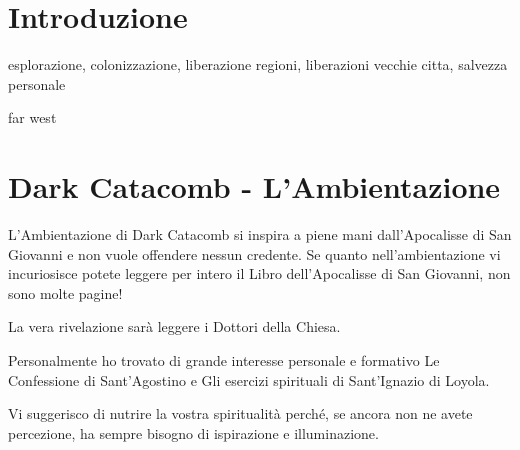 \documentclass[12pt,a4paper,twoside,openany]{book}
\begin{document}








\section{Introduzione}


esplorazione, colonizzazione, liberazione regioni, liberazioni vecchie citta, salvezza personale

far west

\pagebreak

\section{Dark Catacomb - L'Ambientazione}



\begin{narratore}
L'Ambientazione di Dark Catacomb si inspira a piene mani dall'Apocalisse di San Giovanni e non vuole offendere nessun credente. Se quanto nell'ambientazione vi incuriosisce potete leggere per intero il Libro dell'Apocalisse di San Giovanni, non sono molte pagine!
	
La  vera rivelazione sarà leggere i Dottori della Chiesa.
	
Personalmente ho trovato di grande interesse personale e formativo Le Confessione di Sant'Agostino e Gli esercizi spirituali di Sant'Ignazio di Loyola.
	
Vi suggerisco di nutrire la vostra spiritualità perché, se ancora non ne avete percezione, ha sempre bisogno di ispirazione e illuminazione.
	
\end{narratore}	
\end{document}
